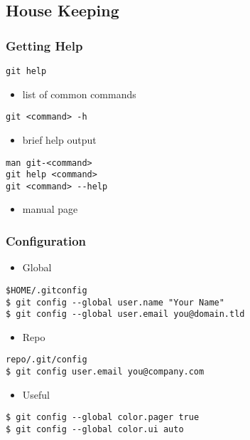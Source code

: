 \documentclass[english]{beamer}
\newcommand{\mysubsection}[2]{%
  \hypertarget{#2}{}%
  \subsection{#1}%
  \label{#2}%
}
\newcommand{\CMD}[1]{%
\texttt{\textcolor{code-green}{#1}}%
}
\begin{document}
\mysubsection{House Keeping}{using:housekeeping}
\begin{frame}
\frametitle{Getting Help}

\CMD{git help}
\begin{itemize}
        \item list of common commands
\end{itemize}

\vspace{.1\textheight}

\CMD{git <command> -h}
\begin{itemize}
        \item brief help output
\end{itemize}

\vspace{.1\textheight}

\CMD{man git-<command>} \\
\CMD{git help <command>} \\
\CMD{git <command> {-}-help} \\
\begin{itemize}
        \item manual page
\end{itemize}

\end{frame}

\begin{frame}
\frametitle{Configuration}

\begin{itemize}
    \item Global
\end{itemize}

\CMD{\$HOME/.gitconfig} \\
\CMD{\$ git config {-}-global user.name "Your Name"} \\
\CMD{\$ git config {-}-global user.email you@domain.tld}

\begin{itemize}
    \item Repo
\end{itemize}

\CMD{repo/.git/config} \\
\CMD{\$ git config user.email you@company.com}

\begin{itemize}
    \item Useful
\end{itemize}

\CMD{\$ git config {-}-global color.pager true} \\
\CMD{\$ git config {-}-global color.ui auto}

\end{frame}
\end{document}
